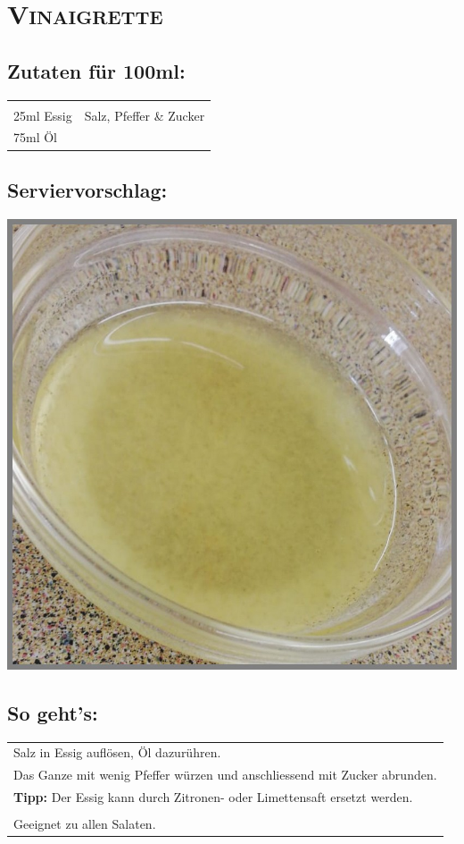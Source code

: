 \section{\textsc{Vinaigrette}}

\subsection*{Zutaten für 100ml:}

\begin{tabular}{p{7.5cm} p{7.5cm}}
	& \\
	25ml Essig & Salz, Pfeffer \& Zucker \\
	75ml Öl & 
\end{tabular}

\subsection*{Serviervorschlag:}

\includegraphics[width=\textwidth]{img/d_vinaigrette.jpeg} \cite{vinaigrette}

\subsection*{So geht's:}

\begin{tabular}{p{15cm}}
	\\
	Salz in Essig auflösen, Öl dazurühren.\\
	Das Ganze mit wenig Pfeffer würzen und anschliessend mit Zucker abrunden.\\
	\textbf{Tipp:} Der Essig kann durch Zitronen- oder Limettensaft ersetzt werden.\\
	\\
	Geeignet zu allen Salaten.
\end{tabular}
